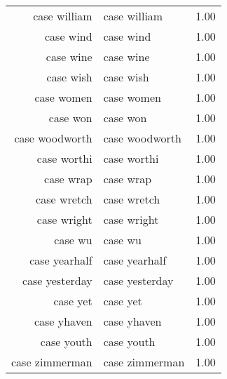 \begin{table}[ht]
\begin{tabular}{rlr}
  case william & case william & 1.00 \\ 
  case wind & case wind & 1.00 \\ 
  case wine & case wine & 1.00 \\ 
  case wish & case wish & 1.00 \\ 
  case women & case women & 1.00 \\ 
  case won & case won & 1.00 \\ 
  case woodworth & case woodworth & 1.00 \\ 
  case worthi & case worthi & 1.00 \\ 
  case wrap & case wrap & 1.00 \\ 
  case wretch & case wretch & 1.00 \\ 
  case wright & case wright & 1.00 \\ 
  case wu & case wu & 1.00 \\ 
  case yearhalf & case yearhalf & 1.00 \\ 
  case yesterday & case yesterday & 1.00 \\ 
  case yet & case yet & 1.00 \\ 
  case yhaven & case yhaven & 1.00 \\ 
  case youth & case youth & 1.00 \\ 
  case zimmerman & case zimmerman & 1.00 \\ 
   \hline
\end{tabular}
\end{table}
